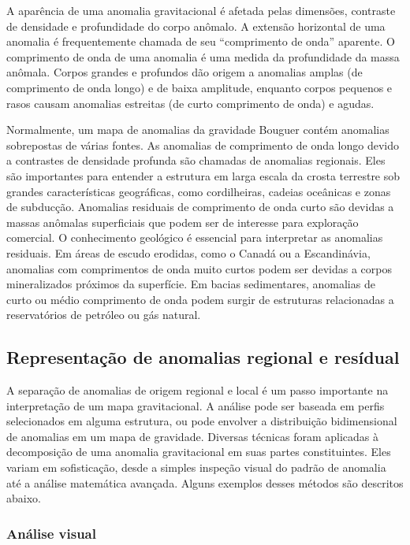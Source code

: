 \documentclass[]{book}
\theoremstyle{definition}
\theoremstyle{definition}
\theoremstyle{definition}
\theoremstyle{remark}
\begin{document}
A aparência de uma anomalia gravitacional é afetada pelas dimensões, contraste de densidade e profundidade do corpo anômalo. A extensão horizontal de uma anomalia é frequentemente chamada de seu ``comprimento de onda'' aparente. O comprimento de onda de uma anomalia é uma medida da profundidade da massa anômala. Corpos grandes e profundos dão origem a anomalias amplas (de comprimento de onda longo) e de baixa amplitude, enquanto corpos pequenos e rasos causam anomalias estreitas (de curto comprimento de onda) e agudas.

Normalmente, um mapa de anomalias da gravidade Bouguer contém anomalias sobrepostas de várias fontes. As anomalias de comprimento de onda longo devido a contrastes de densidade profunda são chamadas de anomalias regionais. Eles são importantes para entender a estrutura em larga escala da crosta terrestre sob grandes características geográficas, como cordilheiras, cadeias oceânicas e zonas de subducção. Anomalias residuais de comprimento de onda curto são devidas a massas anômalas superficiais que podem ser de interesse para exploração comercial. O conhecimento geológico é essencial para interpretar as anomalias residuais. Em áreas de escudo erodidas, como o Canadá ou a Escandinávia, anomalias com comprimentos de onda muito curtos podem ser devidas a corpos mineralizados próximos da superfície. Em bacias sedimentares, anomalias de curto ou médio comprimento de onda podem surgir de estruturas relacionadas a reservatórios de petróleo ou gás natural.

\hypertarget{representacao-de-anomalias-regional-e-residual}{%
\subsection{Representação de anomalias regional e resídual}\label{representacao-de-anomalias-regional-e-residual}}

A separação de anomalias de origem regional e local é um passo importante na interpretação de um mapa gravitacional. A análise pode ser baseada em perfis selecionados em alguma estrutura, ou pode envolver a distribuição bidimensional de anomalias em um mapa de gravidade. Diversas técnicas foram aplicadas à decomposição de uma anomalia gravitacional em suas partes constituintes. Eles variam em sofisticação, desde a simples inspeção visual do padrão de anomalia até a análise matemática avançada. Alguns exemplos desses métodos são descritos abaixo.

\hypertarget{analise-visual}{%
\subsubsection{Análise visual}\label{analise-visual}}
\end{document}
